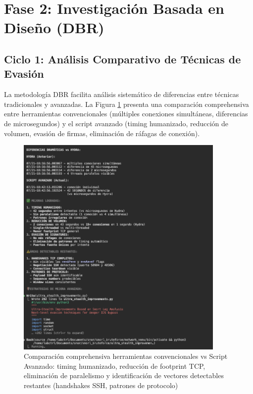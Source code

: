 \section{Fase 2: Investigación Basada en Diseño (DBR)}
\FloatBarrier

\subsection{Ciclo 1: Análisis Comparativo de Técnicas de Evasión}
\FloatBarrier

La metodología DBR facilita análisis sistemático de diferencias entre técnicas tradicionales y avanzadas. La Figura \ref{fig:comprehensive_comparison} presenta una comparación comprehensiva entre herramientas convencionales (múltiples conexiones simultáneas, diferencias de microsegundos) y el script avanzado (timing humanizado, reducción de volumen, evasión de firmas, eliminación de ráfagas de conexión).

\begin{figure}[!htbp]
\centering
\includegraphics[width=0.9\textwidth]{figures/scriptfuerzabrutamejorado.png}
\caption{Comparación comprehensiva herramientas convencionales vs Script Avanzado: timing humanizado, reducción de footprint TCP, eliminación de paralelismo y identificación de vectores detectables restantes (handshakes SSH, patrones de protocolo)}
\label{fig:comprehensive_comparison}
\end{figure}

